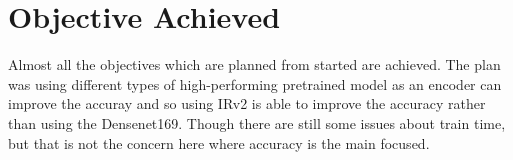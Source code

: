 \documentclass[a4paper,12pt,oneside]{book}
\begin{document}
\section{Objective Achieved}
Almost all the objectives which are planned from started are achieved. The plan was using different types of high-performing pretrained model as an encoder can improve the accuray and so using IRv2 is able to improve the accuracy rather than using the Densenet169. Though there are still some issues about train time, but that is not the concern here where accuracy is the main focused.



\end{document}
